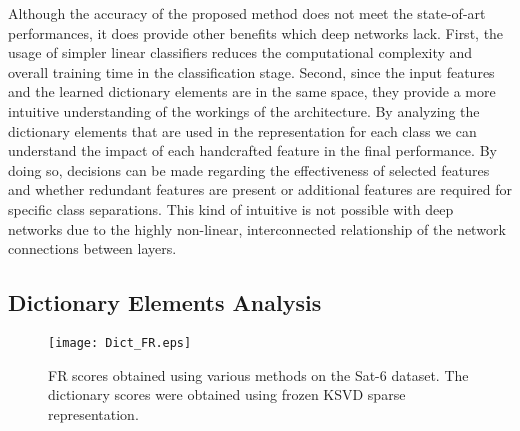 Although the accuracy of the proposed method does not meet the state-of-art performances\cite{Liyanage2020}, it does provide other benefits which deep networks lack. First, the usage of simpler linear classifiers reduces the computational complexity and overall training time in the classification stage. Second, since the input features and the learned dictionary elements are in the same space, they provide a more intuitive understanding of the workings of the architecture. By analyzing the dictionary elements that are used in the representation for each class we can understand the impact of each handcrafted feature in the final performance. By doing so, decisions can be made regarding the effectiveness of selected features and whether redundant features are present or additional features are required for specific class separations. This kind of intuitive  is not possible with deep networks due to the highly non-linear, interconnected relationship of the network connections between layers. 

\subsection{Dictionary Elements Analysis}


\begin{figure*}[!t]%
\centering
\texttt{[image: Dict\_FR.eps]}
\caption{FR scores obtained using various methods on the Sat-6 dataset. The dictionary scores were obtained using frozen KSVD sparse representation.}%
\label{fig:FR}%
\end{figure*}



